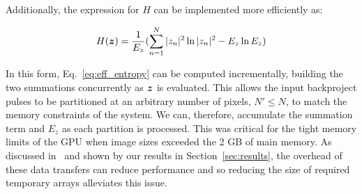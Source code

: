 Additionally, the expression for $H$ can be implemented more efficiently as:

\begin{equation}\label{eq:eff_entropy}
  H(\bm{z}) = \frac{1}{E_z}(\sum_{n=1}^{N} |z_n|^2 \ln |z_n|^2 - E_z \ln E_z)
\end{equation}

In this form, Eq.~\ref{eq:eff_entropy} can be computed incrementally, building
the two summations concurrently as $\bm{z}$ is evaluated. This allows the input
backproject pulses to be partitioned at an arbitrary number of pixels, $N' \le
N$, to match the memory constraints of the system. We can, therefore, accumulate
the summation term and $E_z$ as each partition is processed. This was critical
for the tight memory limits of the GPU when image sizes exceeded the 2 GB of
main memory. As discussed in~\cite{gpu-sar} and shown by our results in
Section~\ref{sec:results}, the overhead of these data transfers can reduce
performance and so reducing the size of required temporary arrays alleviates
this issue.
